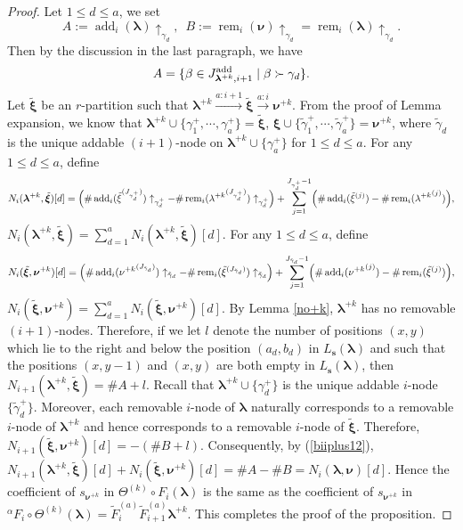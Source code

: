 \documentclass[a4paper,10pt]{amsart}
\theoremstyle{plain}
\def\bs{{\boldsymbol{s}}}
\def\bxi{{\boldsymbol \xi}}
\def\blam{{\boldsymbol \lambda}}
\def\bnu{{\boldsymbol \nu}}
\newcommand{\add}{\operatorname{add}}
\newcommand{\rem}{\operatorname{rem}}
\theoremstyle{plain}
\numberwithin{equation}{section}
\newenvironment{equa}
  {\refstepcounter{theorem}%
   \renewcommand\theequation{\thetheorem}%
   \begin{equation}}
  {\end{equation}}
\begin{document}
\begin{proof}
Let $1\le d\le a$, we set $$A:=\add_{i}(\blam)\uparrow_{\gamma_d},\,\,\, B:=\rem_{i}(\bnu)\uparrow_{\gamma_d}=\rem_{i}(\blam) \uparrow_{\gamma_d}. $$
Then by the discussion in the last paragraph, we have \begin{equa}\label{biiplus12}
A=\{\beta\in J_{\blam^{+k},i+1}^{\rm{add}}\mid \beta\succ{\gamma_d}\}.
\end{equa}
Let $\tilde{\bxi}$ be an $r$-partition such that $\blam^{+k}\xrightarrow{a : i+1}\tilde{\bxi} \xrightarrow{a : i} \bnu^{+k}$.
From the proof of Lemma {expansion}, we know that $\blam^{+k}\cup \{\gamma^+_1, \cdots, \gamma^+_a\}=\tilde \bxi$, $\bxi\cup \{\tilde \gamma^+_1, \cdots, \tilde \gamma^+_a\}=\bnu^{+k}$, where $\tilde \gamma_d$ is the unique addable $(i+1)$-node on $\blam^{+k}\cup \{\gamma^+_a\}$ for $1\le d\le a$.
For any $1\le d\le a$, define
$$N_i(\blam^{+k}, \tilde \bxi)[d]=\Bigl(\#\add_i (\tilde{\xi}^{(J_{\gamma^+_d})} )\uparrow_{\gamma^+_d}-\#\rem_i ({\lambda^{+k}}^{(J_{\gamma^+_d})})\uparrow_{\gamma^+_d}\Bigr)+ \sum^{J_{\gamma^+_d}-1}_{j=1}\Bigl(\#\add_i (\tilde{\xi}^{(j)})-\#\rem_i ({\lambda^{+k}}^{(j)})\Bigr),$$
$N_i(\blam^{+k}, \tilde \bxi)=\sum_{d=1}^a N_i(\blam^{+k}, \tilde \bxi)[d].$
For any $1\le d\le a$, define
$$N_i(\tilde \bxi, \bnu^{+k})[d]=\Bigl(\#\add_i ({\nu^{+k}}^{(J_{\tilde \gamma_d})} )\uparrow_{\tilde \gamma_d}-\#\rem_i (\tilde{\xi}^{(J_{\tilde \gamma_d})})\uparrow_{\tilde \gamma_d}\Bigr)+ \sum^{J_{\tilde \gamma_d}-1}_{j=1}\Bigl(\#\add_i ({\nu^{+k}}^{(j)})-\#\rem_i (\tilde{\xi}^{(j)})\Bigr),$$
$N_i(\tilde\bxi, \bnu^{+k})=\sum_{d=1}^a N_i(\tilde \bxi, \bnu^{+k})[d].$
By Lemma \ref{no+k}, $\blam^{+k}$ has no removable $(i+1)$-nodes.
Therefore, if we let $l$ denote the number of positions \((x,y)\) which lie to the right and below the position \((a_d,b_d)\) in \(L_\bs(\blam)\) and such that the positions \((x,y-1)\) and \((x,y)\) are both empty in \(L_\bs(\blam)\), then $N_{i+1}(\blam^{+k},\tilde{\bxi})=\#A+l$.
Recall that $\blam^{+k}\cup\{\gamma^+_d\}$ is the unique addable $i$-node $\{\tilde \gamma^+_d\}$. Moreover, each removable $i$-node of $\blam$ naturally corresponds to a removable $i$-node of $\blam^{+k}$ and hence corresponds to a removable $i$-node of $\tilde{\bxi}$.
Therefore, $N_{i+1}(\tilde{\bxi}, \bnu^{+k})[d]=-(\#B+l)$. Consequently, by (\ref{biiplus12}), $N_{i+1}(\blam^{+k},\tilde{\bxi})[d]+N_{i} (\tilde\bxi,\bnu^{+k})[d]=\#A-\#B=N_i(\blam, \bnu)[d]$.
Hence the coefficient of $s_{\bnu^{+k}}$ in $\varTheta^{(k)}\circ F_i(\blam)$ is the same as the coefficient of $s_{\bnu^{+k}}$ in ${^\alpha}\!F_i\circ \varTheta^{(k)}(\blam)=\tilde{F}_{i}^{(a)}\tilde{F}_{i+1}^{(a)} \blam^{+k}$.
This completes the proof of the proposition.
\end{proof}
\end{document}
